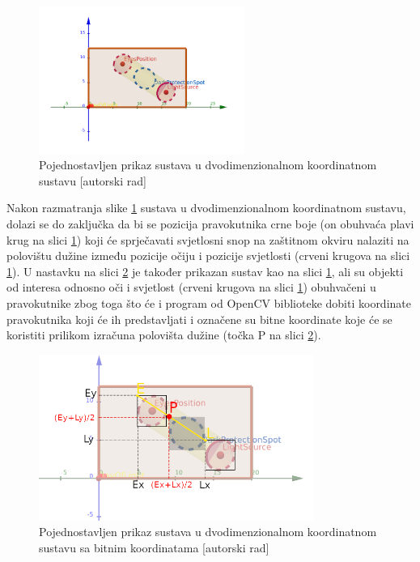 \documentclass{foi}
\begin{document}
\begin{figure}[h!]
    \centering
    \includegraphics[width=0.6\textwidth]{slike/sustav4}
    \caption{Pojednostavljen prikaz sustava u dvodimenzionalnom koordinatnom sustavu [autorski rad]}
    \label{fig:sustav4}
\end{figure}

\newpage
Nakon razmatranja slike \ref{fig:sustav4} sustava u dvodimenzionalnom koordinatnom sustavu, dolazi se do zaključka da bi se pozicija pravokutnika crne boje (on obuhvaća plavi krug na slici \ref{fig:sustav4}) koji će sprječavati svjetlosni snop na zaštitnom okviru nalaziti na polovištu dužine između pozicije očiju i pozicije svjetlosti (crveni krugova na slici \ref{fig:sustav4}). U nastavku na slici \ref{fig:sustavCoord} je također prikazan sustav kao na slici \ref{fig:sustav4}, ali su objekti od interesa odnosno oči i svjetlost (crveni krugova na slici \ref{fig:sustav4}) obuhvačeni u pravokutnike zbog toga što će i program od OpenCV biblioteke dobiti koordinate pravokutnika koji će ih predstavljati i označene su bitne koordinate koje će se koristiti prilikom izračuna polovišta dužine (točka P na slici \ref{fig:sustavCoord}).

\begin{figure}[h!]
    \centering
    \includegraphics[width=0.8\textwidth]{slike/sustav_coord}
    \caption{Pojednostavljen prikaz sustava u dvodimenzionalnom koordinatnom sustavu sa bitnim koordinatama [autorski rad]}
    \label{fig:sustavCoord}
\end{figure}
\end{document}
